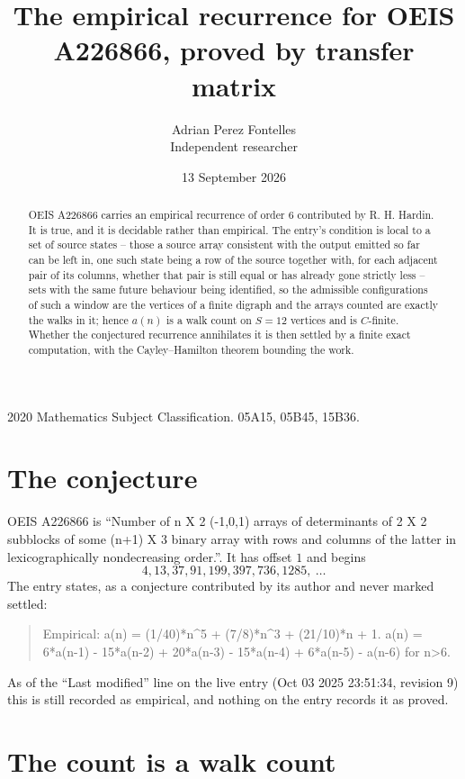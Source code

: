 \documentclass[11pt,a4paper]{article}
\title{The empirical recurrence for OEIS A226866, proved by transfer matrix}
\author{Adrian Perez Fontelles\\ \small Independent researcher}
\date{13 September 2026}
\theoremstyle{plain}
\theoremstyle{definition}
\begin{document}
\maketitle

\begin{abstract}
OEIS A226866 carries an empirical recurrence of order $6$ contributed by R. H. Hardin. It is
true, and it is decidable rather than empirical. The entry's condition is local to a set of source states -- those a source array consistent with the output emitted so far can be left in, one such state being a row of the source together with, for each adjacent pair of its columns, whether that pair is still equal or has already gone strictly less -- sets with the same future behaviour being identified, so
the admissible configurations of such a window are the vertices of a finite digraph and the
arrays counted are exactly the walks in it; hence $a(n)$ is a walk count on $S=12$ vertices
and is $C$-finite. Whether the conjectured recurrence annihilates it is then settled by a
finite exact computation, with the Cayley--Hamilton theorem bounding the work.
\end{abstract}

\noindent\small 2020 Mathematics Subject Classification. 05A15, 05B45, 15B36.\normalsize

\section{The conjecture}

OEIS A226866 is ``Number of n X 2 (-1,0,1) arrays of determinants of 2 X 2 subblocks of some (n+1) X 3 binary array with rows and columns of the latter in lexicographically nondecreasing order.''. It has offset $1$ and begins
\[
4, 13, 37, 91, 199, 397, 736, 1285,\ \dots
\]
The entry states, as a conjecture contributed by its author and never marked settled:
\begin{quote}
Empirical: a(n) = (1/40)*n\^{}5 + (7/8)*n\^{}3 + (21/10)*n + 1. a(n) = 6*a(n-1) - 15*a(n-2) + 20*a(n-3) - 15*a(n-4) + 6*a(n-5) - a(n-6) for n>6.
\end{quote}
As of the ``Last modified'' line on the live entry (Oct 03 2025 23:51:34, revision 9) this is still
recorded as empirical, and nothing on the entry records it as proved.

\section{The count is a walk count}
\end{document}
